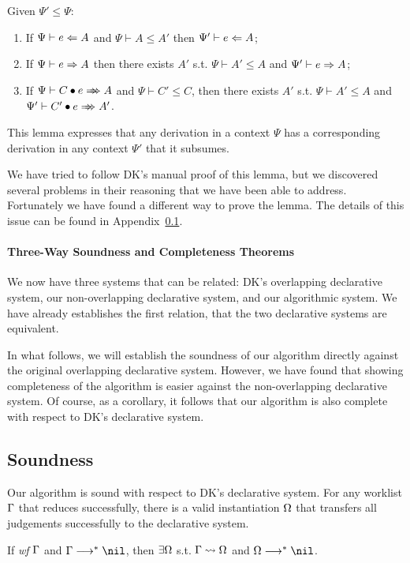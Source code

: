 \begin{lemma}[Subsumption]
Given $\Psi' \le \Psi$:
\begin{enumerate}
    \item If $\Psi \vdash e \Leftarrow A$ and $\Psi \vdash A \le A'$ then $\Psi' \vdash e \Leftarrow A$;
    \item If $\Psi \vdash e \Rightarrow A$ then there exists
        $A'$ s.t. $\Psi \vdash A' \le A$ and $\Psi' \vdash e \Rightarrow A$;
    \item If $\Psi \vdash \appInf{C}{e}{A}$ and $\Psi \vdash C' \le C$,
        then there exists $A'$ s.t. $\Psi \vdash A' \le A$ and $\Psi' \vdash \appInf{C'}{e}{A'}$.
\end{enumerate}
\end{lemma}
This lemma expresses that any derivation in a context $\Psi$ has a corresponding derivation in any context
$\Psi'$ that it subsumes.

We have tried to follow DK's manual proof of this lemma,
but we discovered several problems in their reasoning that we have been able to address.
Fortunately we have found a different way to prove the lemma.
The details of this issue can be found in Appendix~\ref{}.

\paragraph{Three-Way Soundness and Completeness Theorems}
We now have three systems that can be related: DK's overlapping declarative system,
our non-overlapping declarative system, and our algorithmic system.
We have already establishes the first relation, that the two declarative
systems are equivalent.

In what follows, we will establish the soundness of our algorithm directly
against the original overlapping declarative system. However, we have found
that showing completeness of the algorithm is easier against the
non-overlapping declarative system. Of course, as a corollary, it follows that
our algorithm is also complete with respect to DK's declarative system.

\subsection{Soundness}

Our algorithm is sound with respect to DK's declarative system.
For any worklist $\Gamma$ that reduces successfully,
there is a valid instantiation $\Omega$ that transfers all judgements successfully to the declarative system.
\begin{theorem}[Soundness]
If \emph{wf }$\Gamma$ and $\Gm \redto \nil$, then $\exists \Omega$ s.t. $\Gamma\rightsquigarrow\Omega$ and $\Om\redto\nil$.
\end{theorem}

